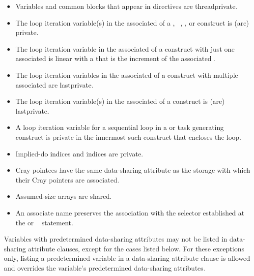 \begin{fortranspecific}
\begin{itemize}
\item Variables and common blocks that appear in  directives
      are threadprivate.
\item The loop iteration variable(s) in the associated  of a
      , ~, , or  
      construct is (are) private.
\item The loop iteration variable in the associated  of a
       construct with just one associated  is 
      linear with a  that is the increment of the 
      associated .
\item The loop iteration variables in the associated  of a
       construct with multiple associated  are lastprivate.
\item The loop iteration variable(s) in the associated  of a
       construct is (are) lastprivate.
\item A loop iteration variable for a sequential loop in a  
      or task generating construct is private in the innermost such construct 
      that encloses the loop.
\item Implied-do indices and  indices are private.
\item Cray pointees have the same data-sharing attribute as the storage 
      with which their Cray pointers are associated.
\item Assumed-size arrays are shared.
\item An associate name preserves the association with the selector established 
      at the  or ~ statement.
\end{itemize}
\end{fortranspecific}

Variables with predetermined data-sharing attributes may not be listed in 
data-sharing attribute clauses, except for the cases listed below. For these 
exceptions only, listing a predetermined variable in a data-sharing attribute 
clause is allowed and overrides the variable's predetermined data-sharing attributes.

